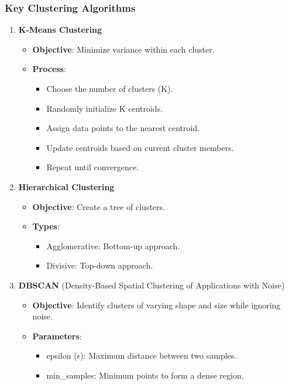 \documentclass[aspectratio=169]{beamer}
\begin{document}
\begin{frame}
    \frametitle{Key Clustering Algorithms}
    \begin{enumerate}
        \item \textbf{K-Means Clustering}
            \begin{itemize}
                \item \textbf{Objective}: Minimize variance within each cluster.
                \item \textbf{Process}:
                    \begin{itemize}
                        \item Choose the number of clusters (K).
                        \item Randomly initialize K centroids.
                        \item Assign data points to the nearest centroid.
                        \item Update centroids based on current cluster members.
                        \item Repeat until convergence.
                    \end{itemize}
            \end{itemize}
        \item \textbf{Hierarchical Clustering}
            \begin{itemize}
                \item \textbf{Objective}: Create a tree of clusters.
                \item \textbf{Types}:
                    \begin{itemize}
                        \item Agglomerative: Bottom-up approach.
                        \item Divisive: Top-down approach.
                    \end{itemize}
            \end{itemize}
        \item \textbf{DBSCAN} (Density-Based Spatial Clustering of Applications with Noise)
            \begin{itemize}
                \item \textbf{Objective}: Identify clusters of varying shape and size while ignoring noise.
                \item \textbf{Parameters}:
                    \begin{itemize}
                        \item epsilon ($\epsilon$): Maximum distance between two samples.
                        \item min\_samples: Minimum points to form a dense region.
                    \end{itemize}
            \end{itemize}
    \end{enumerate}
\end{frame}
\end{document}
